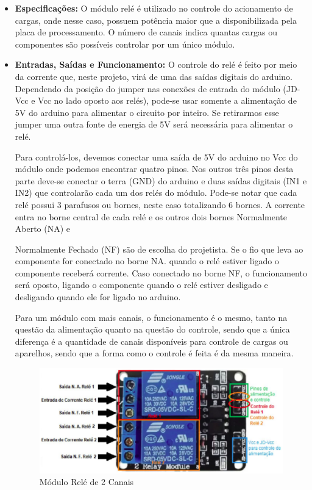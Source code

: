 \begin{itemize}
    \item \textbf{Especificações:} O módulo relé é utilizado no controle do acionamento de cargas, onde nesse caso, possuem potência maior que a disponibilizada pela placa de processamento. O número de canais indica quantas cargas ou componentes são possíveis controlar por um único módulo.

    \item \textbf{Entradas, Saídas e Funcionamento:} O controle do relé é feito por meio da corrente que, neste projeto, virá de uma das saídas digitais do arduino. Dependendo da posição do jumper nas conexões de entrada do módulo (JD-Vcc e Vcc no lado oposto aos relés), pode-se usar somente a alimentação de 5V do arduino para alimentar o circuito por inteiro. Se retirarmos esse jumper uma outra fonte de energia de 5V será necessária para alimentar o relé.
    
    Para controlá-los, devemos conectar uma saída de 5V do arduino no Vcc do módulo onde podemos encontrar quatro pinos. Nos outros três pinos desta parte deve-se conectar o terra (GND) do arduino e duas saídas digitais (IN1 e IN2) que controlarão cada um dos relés do módulo. Pode-se notar que cada relé possui 3 parafusos ou bornes, neste caso totalizando 6 bornes. A corrente entra no borne central de cada relé e os outros dois bornes Normalmente Aberto (NA) e 
    
    Normalmente Fechado (NF) são de escolha do projetista. Se o fio que leva ao componente for conectado no borne NA. quando o relé estiver ligado o componente receberá corrente. Caso conectado no borne NF, o funcionamento será oposto, ligando o componente quando o relé estiver desligado e desligando quando ele for ligado no arduino.
    
    Para um módulo com mais canais, o funcionamento é o mesmo, tanto na questão da alimentação quanto na questão do controle, sendo que a única diferença é a quantidade de canais disponíveis para controle de cargas ou aparelhos, sendo que a forma como o controle é feita é da mesma maneira.

    \begin{figure}[hb]                  
        \centering                          
        \includegraphics[scale=0.6]{figuras/rele1.eps}
        \caption{ Módulo Relé de 2 Canais }   \label{figrele1}              
    \end{figure}

\end{itemize}
